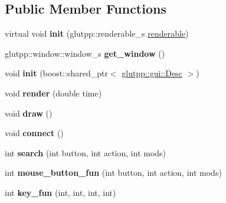 \subsection*{\-Public \-Member \-Functions}
\begin{DoxyCompactItemize}
\item 
\hypertarget{classglutpp_1_1gui_1_1layout_a345b890beed99a2cbf28f4aef78171bc}{virtual void {\bfseries init} (glutpp\-::renderable\-\_\-s \hyperlink{classglutpp_1_1renderable}{renderable})}\label{classglutpp_1_1gui_1_1layout_a345b890beed99a2cbf28f4aef78171bc}

\item 
\hypertarget{classglutpp_1_1gui_1_1layout_a37cb12d529360e0d15dae6caa8100b55}{glutpp\-::window\-::window\-\_\-s {\bfseries get\-\_\-window} ()}\label{classglutpp_1_1gui_1_1layout_a37cb12d529360e0d15dae6caa8100b55}

\item 
\hypertarget{classglutpp_1_1gui_1_1layout_aca660b1e1f3c749b034cb3a329d92611}{void {\bfseries init} (boost\-::shared\-\_\-ptr$<$ \hyperlink{classglutpp_1_1gui_1_1Desc}{glutpp\-::gui\-::\-Desc} $>$)}\label{classglutpp_1_1gui_1_1layout_aca660b1e1f3c749b034cb3a329d92611}

\item 
\hypertarget{classglutpp_1_1gui_1_1layout_a36e5373962c69242b86849fa32f01d62}{void {\bfseries render} (double time)}\label{classglutpp_1_1gui_1_1layout_a36e5373962c69242b86849fa32f01d62}

\item 
\hypertarget{classglutpp_1_1gui_1_1layout_af8e1c6e8812556b7b6d378b54c2e543a}{void {\bfseries draw} ()}\label{classglutpp_1_1gui_1_1layout_af8e1c6e8812556b7b6d378b54c2e543a}

\item 
\hypertarget{classglutpp_1_1gui_1_1layout_aa3ed6f6dcce6fa855fe21b5981ae3675}{void {\bfseries connect} ()}\label{classglutpp_1_1gui_1_1layout_aa3ed6f6dcce6fa855fe21b5981ae3675}

\item 
\hypertarget{classglutpp_1_1gui_1_1layout_a4c18c667db6f8785235b5a00267271e0}{int {\bfseries search} (int button, int action, int mods)}\label{classglutpp_1_1gui_1_1layout_a4c18c667db6f8785235b5a00267271e0}

\item 
\hypertarget{classglutpp_1_1gui_1_1layout_ae7b46224022698da37e6c211133655b2}{int {\bfseries mouse\-\_\-button\-\_\-fun} (int button, int action, int mods)}\label{classglutpp_1_1gui_1_1layout_ae7b46224022698da37e6c211133655b2}

\item 
\hypertarget{classglutpp_1_1gui_1_1layout_a8cfe092a0929ec0298b62dc47f9caf96}{int {\bfseries key\-\_\-fun} (int, int, int, int)}\label{classglutpp_1_1gui_1_1layout_a8cfe092a0929ec0298b62dc47f9caf96}

\end{DoxyCompactItemize}
